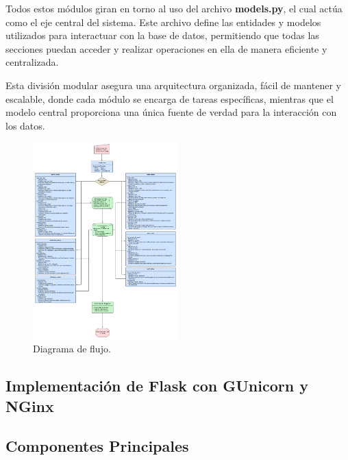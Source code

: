 Todos estos módulos giran en torno al uso del archivo \textbf{models.py}, el cual actúa como el eje central del sistema. Este archivo define las entidades y modelos utilizados para interactuar con la base de datos, permitiendo que todas las secciones puedan acceder y realizar operaciones en ella de manera eficiente y centralizada.

Esta división modular asegura una arquitectura organizada, fácil de mantener y escalable, donde cada módulo se encarga de tareas específicas, mientras que el modelo central proporciona una única fuente de verdad para la interacción con los datos.

\begin{figure}[H]
    \centering
    \includegraphics[width=0.5\textwidth]{figuras/diagrama_flujo.png}
    \caption{Diagrama de flujo.}
    \label{fig:diagrama_flujo}
\end{figure}


\subsection{Implementación de Flask con GUnicorn y NGinx}


\subsection*{Componentes Principales}

